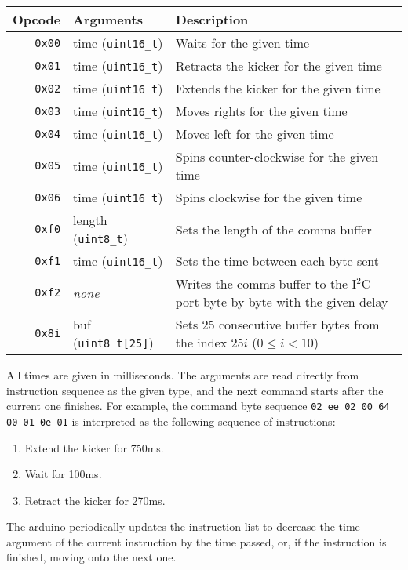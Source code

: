 \documentclass[a4paper]{scrartcl}
\begin{document}
\begin{tabularx}{\textwidth}{rlX}
    Opcode & Arguments & Description \\
    \hline
    \texttt{0x00} & time (\verb$uint16_t$) & Waits for
        the given time \\
    \texttt{0x01} & time (\verb$uint16_t$) &
        Retracts the kicker for the given time \\
    \texttt{0x02} & time (\verb$uint16_t$) &
        Extends the kicker for the given time \\
    \texttt{0x03} & time (\verb$uint16_t$) &
        Moves rights for the given time \\
    \texttt{0x04} & time (\verb$uint16_t$) &
        Moves left for the given time \\
    \texttt{0x05} & time (\verb$uint16_t$) &
        Spins counter-clockwise for the given time \\
    \texttt{0x06} & time (\verb$uint16_t$) &
        Spins clockwise for the given time \\
    \texttt{0xf0} & length (\verb$uint8_t$) &
        Sets the length of the comms buffer \\
    \texttt{0xf1} & time (\verb$uint16_t$) &
        Sets the time between each byte sent \\
    \texttt{0xf2} & \textit{none} &
        Writes the comms buffer to the I$^2$C port byte by byte with the given
        delay \\
    \texttt{0x8i} & buf (\verb$uint8_t[25]$) &
        Sets 25 consecutive buffer bytes from the index $25i$ ($0 \le i < 10$)
        \\ 
\end{tabularx}

All times are given in milliseconds. The arguments are read directly from
instruction sequence as the given type, and the next command starts after the
current one finishes. For example, the command byte sequence \texttt{02 ee 02
00 64 00 01 0e 01} is interpreted as the following sequence of instructions:

\begin{enumerate}
\item Extend the kicker for 750ms.
\item Wait for 100ms.
\item Retract the kicker for 270ms.
\end{enumerate}

The arduino periodically updates the instruction list to decrease the time
argument of the current instruction by the time passed, or, if the instruction
is finished, moving onto the next one.
\end{document}
